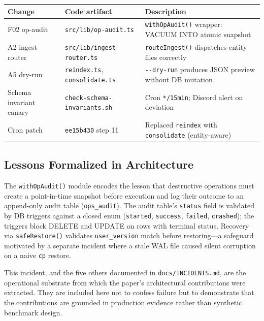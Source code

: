 \documentclass{article}
\begin{document}
\begin{table}[h]
  \centering
  \begin{tabular}{lll}
    \toprule
    Change & Code artifact & Description \\
    \midrule
    F02 op-audit & \texttt{src/lib/op-audit.ts} & \texttt{withOpAudit()} wrapper: VACUUM INTO atomic snapshot \\
    A2 ingest router & \texttt{src/lib/ingest-router.ts} & \texttt{routeIngest()} dispatches entity files correctly \\
    A5 dry-run & \texttt{reindex.ts}, \texttt{consolidate.ts} & \texttt{-{}-dry-run} produces JSON preview without DB mutation \\
    Schema invariant canary & \texttt{check-schema-invariants.sh} & Cron \texttt{*/15min}; Discord alert on deviation \\
    Cron patch & \texttt{ee15b430} step 11 & Replaced \texttt{reindex} with \texttt{consolidate} (entity-aware) \\
    \bottomrule
  \end{tabular}
\end{table}

\subsection{Lessons Formalized in Architecture}

The \texttt{withOpAudit()} module encodes the lesson that destructive operations must
create a point-in-time snapshot before execution and log their outcome to an append-only
audit table (\texttt{ops\_audit}). The audit table's \texttt{status} field is validated
by DB triggers against a closed enum (\texttt{started}, \texttt{success},
\texttt{failed}, \texttt{crashed}); the triggers block DELETE and UPDATE on rows with
terminal status. Recovery via \texttt{safeRestore()} validates \texttt{user\_version}
match before restoring---a safeguard motivated by a separate incident where a stale WAL
file caused silent corruption on a naive \texttt{cp} restore.

This incident, and the five others documented in \texttt{docs/INCIDENTS.md}, are the
operational substrate from which the paper's architectural contributions were extracted.
They are included here not to confess failure but to demonstrate that the contributions
are grounded in production evidence rather than synthetic benchmark design.

\fi %
\end{document}
